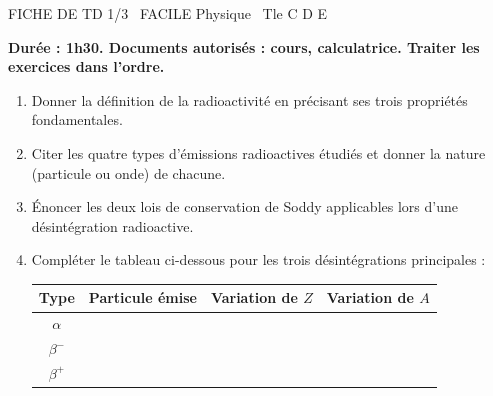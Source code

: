 \documentclass[11pt]{article}
\begin{document}
\begin{tcolorbox}[enhanced,colback=popink,colframe=popink,arc=10pt,boxrule=0pt,left=12pt,right=12pt,top=9pt,bottom=9pt]
{\color{white}\popxbold\small FICHE DE TD 1/3 \textbullet\ FACILE \hfill Physique \textbullet\ Tle C D E\par}
\end{tcolorbox}
\vspace{4pt}
\textbf{Durée : 1h30. Documents autorisés : cours, calculatrice. Traiter les exercices dans l'ordre.}

\begin{exercice}
\begin{enumerate}
    \item Donner la définition de la radioactivité en précisant ses trois propriétés fondamentales.
    \item Citer les quatre types d'émissions radioactives étudiés et donner la nature (particule ou onde) de chacune.
    \item Énoncer les deux lois de conservation de Soddy applicables lors d'une désintégration radioactive.
    \item Compléter le tableau ci-dessous pour les trois désintégrations principales :
    \begin{center}
    \begin{tabular}{|c|c|c|c|}
    \hline
    Type & Particule émise & Variation de $Z$ & Variation de $A$ \\
    \hline
    $\alpha$ & & & \\
    \hline
    $\beta^-$ & & & \\
    \hline
    $\beta^+$ & & & \\
    \hline
    \end{tabular}
    \end{center}
\end{enumerate}
\end{exercice}
\end{document}

